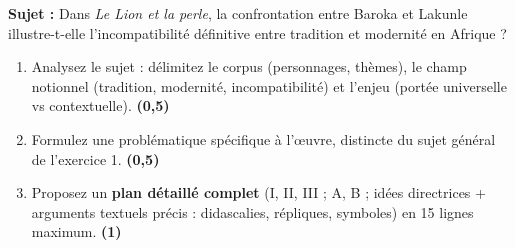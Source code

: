 \documentclass[11pt]{article}
\begin{document}
\begin{exercice}
\textbf{Sujet :} \og Dans \textit{Le Lion et la perle}, la confrontation entre Baroka et Lakunle illustre-t-elle l'incompatibilité définitive entre tradition et modernité en Afrique ? \fg{}

\begin{enumerate}
    \item Analysez le sujet : délimitez le corpus (personnages, thèmes), le champ notionnel (tradition, modernité, incompatibilité) et l'enjeu (portée universelle vs contextuelle). \textbf{(0,5)}
    \item Formulez une problématique spécifique à l'œuvre, distincte du sujet général de l'exercice 1. \textbf{(0,5)}
    \item Proposez un \textbf{plan détaillé complet} (I, II, III ; A, B ; idées directrices + arguments textuels précis : didascalies, répliques, symboles) en 15 lignes maximum. \textbf{(1)}
\end{enumerate}
\end{exercice}
\end{document}
